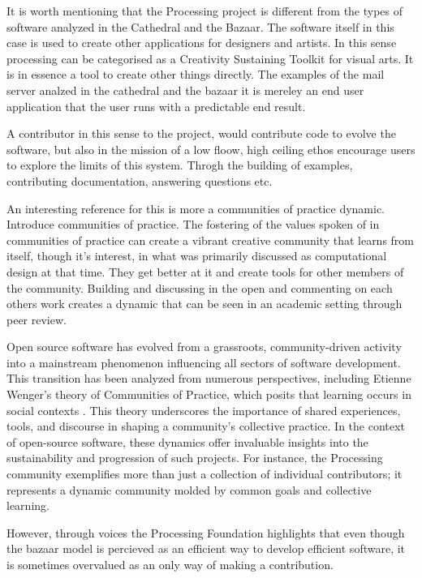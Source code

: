 It is worth mentioning that the Processing project is different from the types of software analyzed in the Cathedral and the Bazaar. The software itself in this case is used to create other applications for designers and artists. In this sense processing can be categorised as a Creativity Sustaining Toolkit for visual arts. It is in essence a tool to create other things directly. The examples of the mail server analzed in the cathedral and the bazaar it is mereley an end user application that the user runs with a predictable end result.

A contributor in this sense to the project, would contribute code to evolve the software, but also in the mission of a low floow, high ceiling ethos encourage users to explore the limits of this system. Throgh the building of examples, contributing documentation, answering questions etc.

An interesting reference for this is more a communities of practice dynamic. 
Introduce communities of practice.
The fostering of the values spoken of in communities of practice can create a vibrant creative community that learns from itself, though it's interest, in what was primarily discussed as computational design at that time. They get better at it and create tools for other members of the community. Building and discussing in the open and commenting on each others work creates a dynamic that can be seen in an academic setting through peer review.

Open source software has evolved from a grassroots, community-driven activity into a mainstream phenomenon influencing all sectors of software development. This transition has been analyzed from numerous perspectives, including Etienne Wenger's theory of Communities of Practice, which posits that learning occurs in social contexts \parencite{wengerCommunitiesPracticeLearning1998}. This theory underscores the importance of shared experiences, tools, and discourse in shaping a community's collective practice. In the context of open-source software, these dynamics offer invaluable insights into the sustainability and progression of such projects. For instance, the Processing community exemplifies more than just a collection of individual contributors; it represents a dynamic community molded by common goals and collective learning.

However, through voices the Processing Foundation highlights that even though the bazaar model is percieved as an efficient way to develop efficient software, it is sometimes overvalued as an only way of making a contribution.

